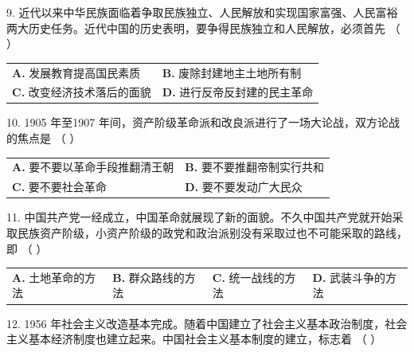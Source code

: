 \documentclass[UTF8,11pt]{ctexart}
\begin{document}
9. 近代以来中华民族面临着争取民族独立、人民解放和实现国家富强、人民富裕两大历史任务。近代中国的历史表明，要争得民族独立和人民解放，必须首先 （    ）


\begin{center}\begin{tabular}{>{\raggedright\arraybackslash}p{\dimexpr(\linewidth-4\tabcolsep)/2\relax}>{\raggedright\arraybackslash}p{\dimexpr(\linewidth-4\tabcolsep)/2\relax}}
\textbf{A.} 发展教育提高国民素质 & \textbf{B.} 废除封建地主土地所有制\\[.35em]
\textbf{C.} 改变经济技术落后的面貌 & \textbf{D.} 进行反帝反封建的民主革命\\[.35em]\end{tabular}\end{center}

10. 1905 年至1907 年间，资产阶级革命派和改良派进行了一场大论战，双方论战的焦点是 （    ）


\begin{center}\begin{tabular}{>{\raggedright\arraybackslash}p{\dimexpr(\linewidth-4\tabcolsep)/2\relax}>{\raggedright\arraybackslash}p{\dimexpr(\linewidth-4\tabcolsep)/2\relax}}
\textbf{A.} 要不要以革命手段推翻清王朝 & \textbf{B.} 要不要推翻帝制实行共和\\[.35em]
\textbf{C.} 要不要社会革命 & \textbf{D.} 要不要发动广大民众\\[.35em]\end{tabular}\end{center}

11. 中国共产党一经成立，中国革命就展现了新的面貌。不久中国共产党就开始采取民族资产阶级，小资产阶级的政党和政治派别没有采取过也不可能采取的路线，即 （    ）


\begin{center}\begin{tabular}{>{\raggedright\arraybackslash}p{\dimexpr(\linewidth-8\tabcolsep)/4\relax}>{\raggedright\arraybackslash}p{\dimexpr(\linewidth-8\tabcolsep)/4\relax}>{\raggedright\arraybackslash}p{\dimexpr(\linewidth-8\tabcolsep)/4\relax}>{\raggedright\arraybackslash}p{\dimexpr(\linewidth-8\tabcolsep)/4\relax}}
\textbf{A.} 土地革命的方法 & \textbf{B.} 群众路线的方法 & \textbf{C.} 统一战线的方法 & \textbf{D.} 武装斗争的方法\\[.35em]\end{tabular}\end{center}

12. 1956 年社会主义改造基本完成。随着中国建立了社会主义基本政治制度，社会主义基本经济制度也建立起来。中国社会主义基本制度的建立，标志着 （    ）
\end{document}
